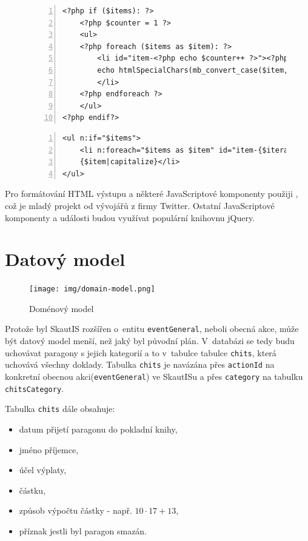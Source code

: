 \documentclass[thesis=B,czech]{FITthesis}[2011/06/14]
\begin{document}
\begin{figure}[h]
\begin{lstlisting}[caption=Vypsání seznamu položek bez použití Latte, numbers=left]
<?php if ($items): ?>
    <?php $counter = 1 ?>
    <ul>
    <?php foreach ($items as $item): ?>
        <li id="item-<?php echo $counter++ ?>"><?php
        echo htmlSpecialChars(mb_convert_case($item, MB_CASE_TITLE)) ?>
        </li>
    <?php endforeach ?>
    </ul>
<?php endif?>
\end{lstlisting}

\begin{lstlisting}[caption=Vypsání seznamu položek pomocí Latte, numbers=left]
<ul n:if="$items">
    <li n:foreach="$items as $item" id="item-{$iterator->counter}">
    {$item|capitalize}</li>
</ul>
\end{lstlisting}
\end{figure}

Pro formátování HTML výstupu a některé JavaScriptové komponenty použiji \cite{twBootstrap}, což je mladý projekt od vývojářů z firmy Twitter. Ostatní JavaScriptové komponenty a události budou využívat populární knihovnu jQuery\cite{jquery}.

\section{Datový model}
\begin{figure}[h] \centering
 	\caption[Doménový model]{Doménový model}\label{fig:domain-model}
	\texttt{[image: img/domain-model.png]}
\end{figure}
Protože byl SkautIS rozšířen o~entitu \texttt{eventGeneral}, neboli obecná akce, může být datový model menší, než jaký byl původní plán. V~databázi se tedy budu uchovávat paragony s jejich kategorií a to v~tabulce tabulce \texttt{chits}, která uchovává všechny doklady. Tabulka \texttt{chits} je navázána přes \texttt{actionId} na konkretní obecnou akci(\texttt{eventGeneral}) ve SkautISu a přes \texttt{category} na tabulku \texttt{chitsCategory}.

Tabulka \texttt{chits} dále obsahuje:
 \begin{itemize}
 	\item datum přijetí paragonu do pokladní knihy,
 	\item jméno příjemce,
 	\item účel výplaty,
 	\item částku,
	\item způsob výpočtu částky - např. $10\cdot17+13$,
	\item příznak jestli byl paragon smazán.
\end{itemize} 
\end{document}
